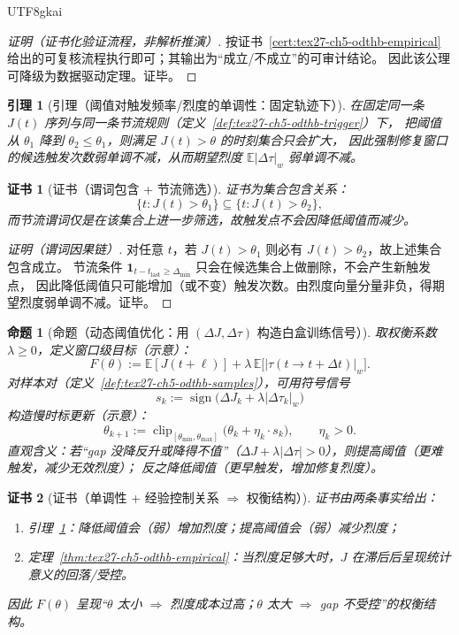 \documentclass[12pt]{article}
\newtheorem{proposition}{命题}[section]
\newtheorem{lemma}{引理}[section]
\newtheorem{Certificate}{证书}[section]
\newcommand{\indicator}[1]{\mathbf{1}_{#1}}
\begin{document}
\begin{CJK*}{UTF8}{gkai}
\begin{proof}[证明（证书化验证流程，非解析推演）]
按证书~\ref{cert:tex27-ch5-odthb-empirical} 给出的可复核流程执行即可；其输出为“成立/不成立”的可审计结论。
因此该公理可降级为数据驱动定理。证毕。
\end{proof}

\begin{lemma}[引理（阈值对触发频率/烈度的单调性：固定轨迹下）]
\label{lem:tex27-ch5-odthb-threshold-mono}
在固定同一条 $J(t)$ 序列与同一条节流规则（定义~\ref{def:tex27-ch5-odthb-trigger}）下，
把阈值从 $\theta_1$ 降到 $\theta_2\le \theta_1$，则满足 $J(t)>\theta$ 的时刻集合只会扩大，
因此强制修复窗口的候选触发次数弱单调不减，从而期望烈度 $\mathbb{E}|\Delta\tau|_w$ 弱单调不减。
\end{lemma}

\begin{Certificate}[证书（谓词包含 + 节流筛选）]
\label{cert:tex27-ch5-odthb-threshold-mono}
证书为集合包含关系：
\[
  \{t:J(t)>\theta_1\}\subseteq \{t:J(t)>\theta_2\},
\]
而节流谓词仅是在该集合上进一步筛选，故触发点不会因降低阈值而减少。
\end{Certificate}

\begin{proof}[证明（谓词因果链）]
对任意 $t$，若 $J(t)>\theta_1$ 则必有 $J(t)>\theta_2$，故上述集合包含成立。
节流条件 $\indicator{t-t_{\mathrm{last}}\ge \Delta_{\min}}$ 只会在候选集合上做删除，不会产生新触发点，
因此降低阈值只可能增加（或不变）触发次数。由烈度向量分量非负，得期望烈度弱单调不减。证毕。
\end{proof}

\begin{proposition}[命题（动态阈值优化：用 $(\Delta J,\Delta\tau)$ 构造白盒训练信号）]
\label{prop:tex27-ch5-odthb-threshold-update}
取权衡系数 $\lambda\ge 0$，定义窗口级目标（示意）：
\[
  F(\theta):=\mathbb{E}[J(t+\ell)] + \lambda\,\mathbb{E}\bigl[|\tau(t\to t+\Delta t)|_w\bigr].
\]
对样本对（定义~\ref{def:tex27-ch5-odthb-samples}），可用符号信号
\[
  s_k:=\operatorname{sign}\!\Big(\Delta J_k + \lambda|\Delta\tau_k|_w\Big)
\]
构造慢时标更新（示意）：
\[
  \theta_{k+1}:=\operatorname{clip}_{[\theta_{\min},\theta_{\max}]}\Big(\theta_k + \eta_k\cdot s_k\Big),
  \qquad \eta_k>0.
\]
直观含义：若“gap 没降反升或降得不值”（$\Delta J+\lambda|\Delta\tau|>0$），则提高阈值（更难触发，减少无效烈度）；
反之降低阈值（更早触发，增加修复烈度）。
\end{proposition}

\begin{Certificate}[证书（单调性 + 经验控制关系 $\Rightarrow$ 权衡结构）]
\label{cert:tex27-ch5-odthb-threshold-update}
证书由两条事实给出：
\begin{enumerate}
  \item 引理~\ref{lem:tex27-ch5-odthb-threshold-mono}：降低阈值会（弱）增加烈度；提高阈值会（弱）减少烈度；
  \item 定理~\ref{thm:tex27-ch5-odthb-empirical}：当烈度足够大时，$J$ 在滞后后呈现统计意义的回落/受控。
\end{enumerate}
因此 $F(\theta)$ 呈现“$\theta$ 太小 $\Rightarrow$ 烈度成本过高；$\theta$ 太大 $\Rightarrow$ gap 不受控”的权衡结构。
\end{Certificate}


\end{CJK*}
\end{document}
